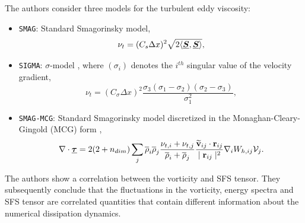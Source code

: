 The authors consider three models for the turbulent eddy viscosity:
\begin{itemize}
    \item \texttt{SMAG}: Standard Smagorinsky model,
        \begin{equation}
            \nu_t = (C_s \Delta x)^2 \sqrt{2 \langle \underline{\bm{S}}, \underline{\bm{S}} \rangle},
            \label{eq:Okraschevski2022-SMAG}
        \end{equation}
        
    \item \texttt{SIGMA}: $\sigma$-model \parencite{nicoud2011using}, where $(\sigma_i)$ denotes the $i^{th}$ singular value of the velocity gradient,
        \begin{equation}
            \nu_t = (C_{\sigma} \Delta x)^2 \frac{\sigma_3 (\sigma_1 - \sigma_2) (\sigma_2 - \sigma_3)}{\sigma_1^2},
            \label{eq:Okraschevski2022-SIGMA}
        \end{equation}
    
    \item \texttt{SMAG-MCG}: Standard Smagorinsky model discretized in the Monaghan-Cleary-Gingold (MCG) form \parencite{cleary1999conduction},
        \begin{equation}
            \nabla \cdot \underline{\bm{\tau}} = 2(2+n_{dim}) \sum_j \overline{\rho}_i \overline{\rho}_j \frac{\nu_{t, i} + \nu_{t, j}}{\overline{\rho}_i + \overline{\rho}_j} \frac{\widetilde{\mathbf{v}}_{ij} \cdot \mathbf{r}_{ij} }{\mid \mathbf{r}_{ij} \mid^{2}} \nabla_{i} W_{h, ij} \mathcal{V}_j.
            \label{eq:Okraschevski2022-SMAG-MCG}
        \end{equation}
\end{itemize}

The authors show a correlation between the vorticity and SFS tensor. They subsequently conclude that the fluctuations in the vorticity, energy spectra and SFS tensor are correlated quantities that contain different information about the numerical dissipation dynamics.

